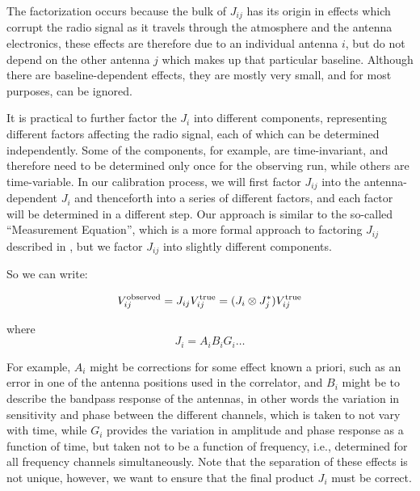 \documentclass[force,almostfull,justified]{tufte-book}
\begin{document}
The factorization occurs because the bulk of $J_{ij}$ has its origin in effects which corrupt the
radio signal as it travels through the atmosphere and the antenna electronics, these effects are
therefore due to an individual antenna $i$, but do not depend on the other antenna $j$ which makes up
that particular baseline.  Although there are baseline-dependent effects, they are mostly very small,
and for most purposes, can be ignored.

It is practical to further factor the $J_i$ into different components, representing different factors
affecting the radio signal, each of which can be determined independently.  Some of the components,
for example, are time-invariant, and therefore need to be determined only once for the observing run,
while others are time-variable.  In our calibration process, we will first factor $J_{ij}$ into the
antenna-dependent $J_i$ and thenceforth into a series of different factors, and each factor will be
determined in a different step.  Our approach is similar to the so-called ``Measurement Equation'',
which is a more formal approach to factoring $J_{ij}$ described in \citep{HamakerBS1999}, but we
factor $J_{ij}$ into slightly different components.

So we can write:

\begin{equation}
V_{ij}^{\rm observed} = J_{ij} V_{ij}^{\rm true}
                   = (J_i \otimes J_j^*) V_{ij}^{\rm true}
\end{equation}

where
\begin{equation}
J_i = A_i B_i G_i  \dots
\end{equation}

For example, $A_i$ might be corrections for some effect known a priori, such as an error in one of the
antenna positions used in the correlator, and $B_i$ might be to describe the bandpass response of the
antennas, in other words the variation in sensitivity and phase between the different channels, which
is taken to not vary with time, while $G_i$ provides the variation in amplitude and phase response as
a function of time, but taken not to be a function of frequency, i.e., determined for all frequency
channels simultaneously.  Note that the separation of these effects is not unique, however, we want to
ensure that the final product $J_i$ must be correct.
\end{document}
